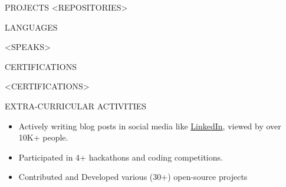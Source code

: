\documentclass{resume}
\begin{document}
\vspace{1.5em}


\begin{rSection}{PROJECTS}    
    <REPOSITORIES>
\end{rSection}
\vspace{1.5em}


\begin{rSection}{LANGUAGES}

\begin{itemize}
    <SPEAKS>
\end{itemize}

\end{rSection}




\begin{rSection}{CERTIFICATIONS}

    \begin{itemize}
        <CERTIFICATIONS>
    \end{itemize}
    
    \end{rSection}
    


\begin{rSection}{EXTRA-CURRICULAR ACTIVITIES}

    \begin{itemize}
        \item Actively writing blog posts in social media like \href{https://www.linkedin.com/in/rahul-marban}{LinkedIn}, viewed by over 10K+ people.
        \item Participated in 4+ hackathons and coding competitions.
        \item Contributed and Developed various (30+) open-source projects
    \end{itemize}
    
    \end{rSection}
    
    \vspace{1.5em}

    
    
\end{document}
